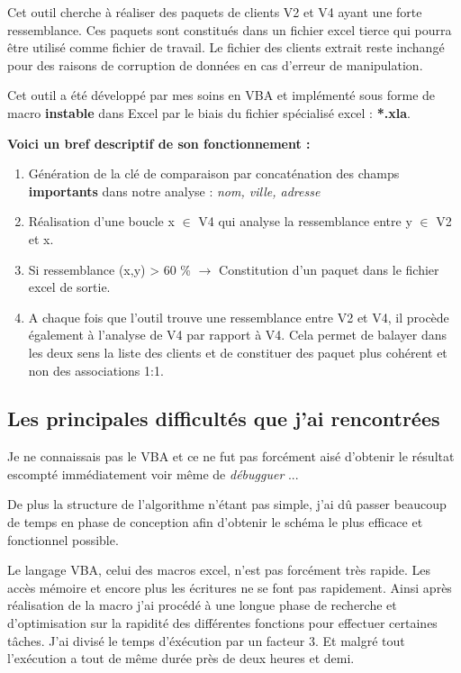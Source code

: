 Cet outil cherche à réaliser des paquets de clients V2 et V4 ayant une forte ressemblance. Ces paquets sont constitués dans un fichier excel tierce qui pourra être utilisé comme fichier de travail. Le fichier des clients extrait reste inchangé pour des raisons de corruption de données en cas d'erreur de manipulation.

Cet outil a été développé par mes soins en VBA et implémenté sous forme de macro \textbf{instable} dans Excel par le biais du fichier spécialisé excel : \textbf{*.xla}.

\textbf{Voici un bref descriptif de son fonctionnement :}

\begin{enumerate}
	\item Génération de la clé de comparaison par concaténation des champs \textbf{importants} dans notre analyse : \textit{nom, ville, adresse}
	\item Réalisation d'une boucle x $\in$ V4 qui analyse la ressemblance entre y $\in$ V2 et x. 
	\item Si ressemblance (x,y) > 60 \% $\rightarrow$ Constitution d'un paquet dans le fichier excel de sortie.
	\item A chaque fois que l'outil trouve une ressemblance entre V2 et V4, il procède également à l'analyse de V4 par rapport à V4. Cela permet de balayer dans les deux sens la liste des clients et de constituer des paquet plus cohérent et non des associations 1:1.
\end{enumerate}

\subsection{Les principales difficultés que j'ai rencontrées}

Je ne connaissais pas le VBA et ce ne fut pas forcément aisé d'obtenir le résultat escompté immédiatement voir même de \textit{débugguer} ...

De plus la structure de l'algorithme n'étant pas simple, j'ai dû passer beaucoup de temps en phase de conception afin d'obtenir le schéma le plus efficace et fonctionnel possible.

Le langage VBA, celui des macros excel, n'est pas forcément très rapide. Les accès mémoire et encore plus les écritures ne se font pas rapidement. Ainsi après réalisation de la macro j'ai procédé à une longue phase de recherche et d'optimisation sur la rapidité des différentes fonctions pour effectuer certaines tâches. J'ai divisé le temps d'éxécution par un facteur 3. Et malgré tout l'exécution a tout de même durée près de deux heures et demi.

